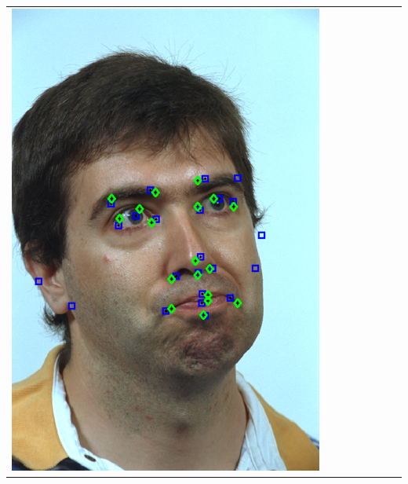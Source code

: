 \documentclass[portrait,final,a0paper,fontscale=0.277]{baposter}
\begin{document}
\begin{poster}
{{\begin{tabular}{@{}rccccccc@{}}
\parbox[c]{0.11\linewidth}{\includegraphics[width=\linewidth]{images/l_rc_success_2.pdf}} \\
\midrule
\begin{sideways}\end{sideways} &

\end{tabular}}}
\end{poster}
\end{document}
